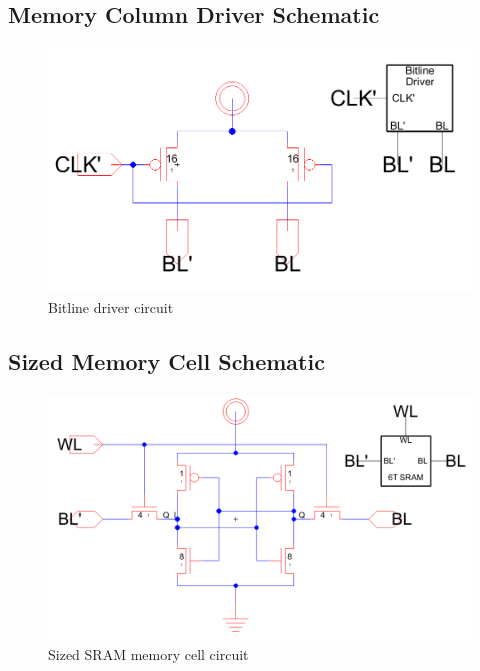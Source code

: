 \documentclass[12pt]{report}
\begin{document}
\subsection*{Memory Column Driver Schematic}
\begin{figure}[H]
  \centering
    \includegraphics[width=1.0\textwidth]{bitline_driver_circuit.PNG}
  \caption{Bitline driver circuit}
  \label{fig:bitline_driver_circuit}
\end{figure}

\subsection*{Sized Memory Cell Schematic}
\begin{figure}[H]
  \centering
    \includegraphics[width=1.0\textwidth]{sram_cell_circuit.PNG}
  \caption{Sized SRAM memory cell circuit}
  \label{fig:sram_cell_circuit}
\end{figure}
\end{document}
